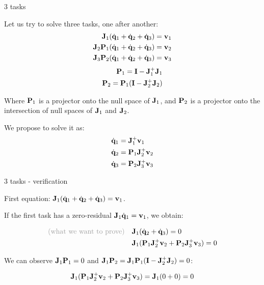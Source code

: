 \documentclass{beamer}
\newcommand{\dq} {\dot{\mathbf{q}}}
\begin{document}
\begin{frame}{3 tasks}
	\begin{flushleft}
		
		Let us try to solve three tasks, one after another:
		\begin{align}
			\bo{J}_1 (\dq_1 + \dq_2 + \dq_3) = \bo{v}_1 \\
			\bo{J}_2 \bo{P}_1 (\dq_1 + \dq_2 + \dq_3) = \bo{v}_2 \\
			\bo{J}_3 \bo{P}_2 (\dq_1 + \dq_2 + \dq_3) = \bo{v}_3
		\end{align}
		\begin{align}
			\mathbf{P}_1 =\mathbf{I} - \mathbf{J}_1^+\mathbf{J}_1 \\
			\mathbf{P}_2 =\mathbf{P}_1 (\mathbf{I} - \mathbf{J}_2^+\mathbf{J}_2)
		\end{align}
		
		Where $\mathbf{P}_1$ is a projector onto the null space of $\mathbf{J}_1$, and $\mathbf{P}_2$ is a projector onto the intersection of null spaces of $\mathbf{J}_1$ and $\mathbf{J}_2$.
		
		We propose to solve it as:
		\begin{align}
	\dq_1 &= \bo{J}_1^+ \bo{v}_1 \\
	\dq_2 &= \bo{P}_1 \bo{J}_2^+ \bo{v}_2 \\
	\dq_3 &= \bo{P}_2 \bo{J}_3^+ \bo{v}_3
		\end{align}		
		
	\end{flushleft}
\end{frame}



\begin{frame}{3 tasks - verification}
	\begin{flushleft}
		
		First equation: $\bo{J}_1 (\dq_1 + \dq_2 + \dq_3) = \bo{v}_1$.
		
		\bigskip
		
		If the first task has a zero-residual $\bo{J}_1 \dq_1 = \bo{v}_1$, we obtain:
		
		\begin{align}
			\textcolor{mygray}{\text{(what we want to prove)}} \ \ \ 
			&\bo{J}_1 (\dq_2 + \dq_3) = 0 \\
			&\bo{J}_1 (\bo{P}_1 \bo{J}_2^+ \bo{v}_2 
			+ 
			\bo{P}_2 \bo{J}_3^+ \bo{v}_3) = 0 
		\end{align}
		
		We can observe $\mathbf{J}_1 \mathbf{P}_1 = 0$ and $\mathbf{J}_1 \mathbf{P}_2 =\mathbf{J}_1 \mathbf{P}_1 (\mathbf{I} - \mathbf{J}_2^+\mathbf{J}_2)  = 0$:
		
		\begin{align}
			\mathbf{J}_1 (\mathbf{P}_1 \mathbf{J}_2^+ \mathbf{v}_2 
			+ 
			\mathbf{P}_2 \mathbf{J}_3^+ \mathbf{v}_3) = \mathbf{J}_1(0 + 0) = 0
		\end{align}
		
	\end{flushleft}
\end{frame}
\end{document}
